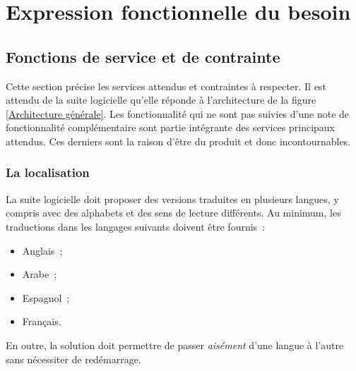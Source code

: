 \chapter{Expression fonctionnelle du besoin}

\section{Fonctions de service et de contrainte}
Cette section précise les services attendus et contraintes à respecter.
Il est attendu de la suite logicielle qu'elle réponde à l'architecture de la figure \ref{Architecture générale}. Les fonctionnalité qui ne sont pas suivies d'une note de fonctionnalité complémentaire sont partie intégrante des services principaux attendus. Ces derniers sont la raison d'être du produit et donc incontournables.

\subsection{La localisation}
La suite logicielle doit proposer des versions traduites en plusieurs langues, y compris avec des alphabets et des sens de lecture différents. Au minimum, les traductions dans les langages suivants doivent être fournis~:
\begin{itemize}
	\item Anglais~;
	\item Arabe~;
	\item Espagnol~;
	\item Français.
\end{itemize}
En outre, la solution doit permettre de passer \emph{aisément} d'une langue à l'autre sans nécessiter de redémarrage.

